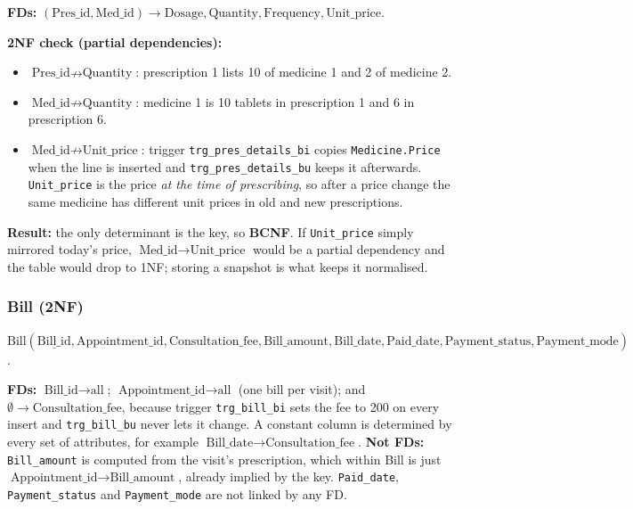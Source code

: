 \documentclass[11pt,a4paper]{article}
\newcommand{\code}[1]{\texttt{#1}}
\begin{document}
\textbf{FDs:} $(\text{Pres\_id}, \text{Med\_id}) \rightarrow \text{Dosage}, \text{Quantity}, \text{Frequency}, \text{Unit\_price}$.

\textbf{2NF check (partial dependencies):}
\begin{itemize}
  \item $\text{Pres\_id} \nrightarrow \text{Quantity}$: prescription 1 lists 10 of medicine 1 and 2 of medicine 2.
  \item $\text{Med\_id} \nrightarrow \text{Quantity}$: medicine 1 is 10 tablets in prescription 1 and 6 in prescription 6.
  \item $\text{Med\_id} \nrightarrow \text{Unit\_price}$: trigger \code{trg\_pres\_details\_bi} copies \code{Medicine.Price} when the line is inserted and \code{trg\_pres\_details\_bu} keeps it afterwards. \code{Unit\_price} is the price \emph{at the time of prescribing}, so after a price change the same medicine has different unit prices in old and new prescriptions.
\end{itemize}

\textbf{Result:} the only determinant is the key, so \textbf{BCNF}. If \code{Unit\_price} simply mirrored today's price, $\text{Med\_id} \rightarrow \text{Unit\_price}$ would be a partial dependency and the table would drop to 1NF; storing a snapshot is what keeps it normalised.

\subsubsection*{Bill (2NF)}
$\text{Bill}(\underline{\text{Bill\_id}}, \text{Appointment\_id}, \text{Consultation\_fee}, \text{Bill\_amount}, \text{Bill\_date}, \text{Paid\_date}, \text{Payment\_status}, \text{Payment\_mode})$.

\textbf{FDs:} $\text{Bill\_id} \rightarrow \text{all}$; $\text{Appointment\_id} \rightarrow \text{all}$ (one bill per visit); and $\emptyset \rightarrow \text{Consultation\_fee}$, because trigger \code{trg\_bill\_bi} sets the fee to 200 on every insert and \code{trg\_bill\_bu} never lets it change. A constant column is determined by every set of attributes, for example $\text{Bill\_date} \rightarrow \text{Consultation\_fee}$.
\textbf{Not FDs:} \code{Bill\_amount} is computed from the visit's prescription, which within Bill is just $\text{Appointment\_id} \rightarrow \text{Bill\_amount}$, already implied by the key. \code{Paid\_date}, \code{Payment\_status} and \code{Payment\_mode} are not linked by any FD.
\end{document}

